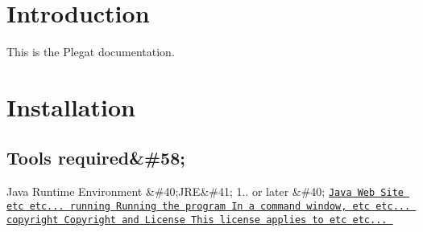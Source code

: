 \hypertarget{index_intro_sec}{}\section{Introduction}\label{index_intro_sec}
This is the Plegat documentation.\hypertarget{index_install_sec}{}\section{Installation}\label{index_install_sec}
\hypertarget{index_tools_subsec}{}\subsection{Tools required\&\#58;}\label{index_tools_subsec}

\begin{DoxyItemize}
\item Java Runtime Environment \&\#40;J\+RE\&\#41; 1.. or later \&\#40;
\footnotesize \href{http&#58;//java.sun.com/}{\tt Java Web Site etc etc...  running Running the program In a command window, etc etc...  copyright Copyright and License This license applies to etc etc...  }
\normalsize 
\end{DoxyItemize}